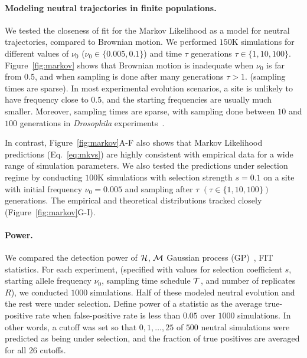 \documentclass[11pt]{article}
\begin{document}
\paragraph{Modeling neutral trajectories in finite populations.} 
We tested the closeness of fit for the Markov Likelihood as a model
for neutral trajectories, compared to Brownian motion. We performed
$150$K simulations for different values of $\nu_0$
($\nu_0\in\{0.005,0.1\}$) and time $\tau$ generations $\tau\in
\{1,10,100\}$. Figure~\ref{fig:markov} shows that Brownian motion is
inadequate when $\nu_0$ is far from $0.5$, and when sampling is done
after many generations $\tau>1$. (sampling times are sparse). In most
experimental evolution scenarios, a site is unlikely to have frequency
close to $0.5$, and the starting frequencies are usually much
smaller. Moreover, sampling times are sparse, with sampling done
between $10$ and $100$ generations in \emph{Drosophila}
experiments~\cite{orozco2012adaptation, zhou2011experimental}.

In contrast, Figure~\ref{fig:markov}A-F also shows that Markov
Likelihood predictions (Eq.~\ref{eq:mkvs}) are highly consistent with
empirical data for a wide range of simulation parameters. We also
tested the predictions under selection regime by conducting $100$K
simulations with selection strength $s=0.1$ on a site with initial
frequency $\nu_0=0.005$ and sampling after $\tau$
$(\tau\in\{1,10,100\})$ generations. The empirical and theoretical
distributions tracked closely (Figure~\ref{fig:markov}G-I).

\paragraph{Power.} We compared the detection power of ${\cal H}$, ${\cal M}$
Gaussian process (GP)~\cite{Terhorst2015Multi},
FIT~\cite{feder2014Identifying} statistics.  For each experiment,
(specified with values for selection coefficient $s$, starting allele
frequency $\nu_0$, sampling time schedule ${\cal T}$, and number of
replicates $R$), we conducted $1000$ simulations. Half of these
modeled neutral evolution and the rest were under selection. Define
power of a statistic as the average true-positive rate when
false-positive rate is less than $0.05$ over $1000$ simulations. In
other words, a cutoff was set so that  $0,1,\ldots,25$ of $500$ neutral
simulations were predicted as being under selection, and the fraction of true positives are averaged for all 26 cutoffs.
\end{document}
